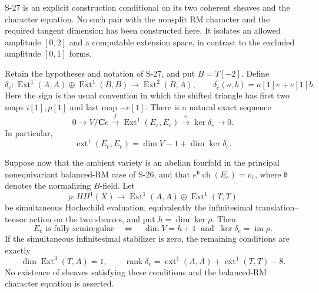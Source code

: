 S-27 is an explicit construction conditional on its two
coherent sheaves and the character equation. No such pair
with the nonsplit RM character and the required tangent
dimension has been constructed here. It isolates an
allowed amplitude $[0,2]$ and a computable extension space,
in contrast to the excluded amplitude $[0,1]$ forms.

\begin{proposition}
\label{prop:semireg-cone-exact-tangent}
Retain the hypotheses and notation of S-27, and put
$B=T[-2]$. Define
\[
 \delta_e:\operatorname{Ext}^1(A,A)\oplus
                 \operatorname{Ext}^1(B,B)
        \longrightarrow\operatorname{Ext}^2(B,A),
 \qquad
 \delta_e(a,b)=a[1]e+e[1]b.
 \tag{S28.1}
\]
Here the sign is the usual convention in which the shifted
triangle has first two maps $i[1],p[1]$ and last map
$-e[1]$. There is a natural exact sequence
\[
 0\longrightarrow V/\mathbf C e
   \xrightarrow{j}\operatorname{Ext}^1(E_e,E_e)
   \xrightarrow{r}\ker\delta_e\longrightarrow0.
 \tag{S28.2}
\]
In particular,
\[
 \operatorname{ext}^1(E_e,E_e)
   =\dim V-1+\dim\ker\delta_e.
 \tag{S28.3}
\]

Suppose now that the ambient variety is an abelian fourfold
in the principal nonequivariant balanced-RM case of S-26,
and that $e^{\mathfrak b}\operatorname{ch}(E_e)=v_1$,
where $\mathfrak b$ denotes the normalizing $B$-field.
Let
\[
 \rho:HH^1(X)\longrightarrow
       \operatorname{Ext}^1(A,A)\oplus
       \operatorname{Ext}^1(T,T)
 \tag{S28.4}
\]
be simultaneous Hochschild evaluation, equivalently the
infinitesimal translation--tensor action on the two sheaves,
and put $h=\dim\ker\rho$. Then
\[
 E_e\text{ is fully semiregular}
 \quad\Longleftrightarrow\quad
 \dim V=h+1\ \text{ and }\ \ker\delta_e=\operatorname{im}\rho.
 \tag{S28.5}
\]
If the simultaneous infinitesimal stabilizer is zero,
the remaining conditions are exactly
\[
 \dim\operatorname{Ext}^3(T,A)=1,
 \qquad
 \operatorname{rank}\delta_e=
       \operatorname{ext}^1(A,A)+\operatorname{ext}^1(T,T)-8.
 \tag{S28.6}
\]
No existence of sheaves satisfying these conditions and
the balanced-RM character equation is asserted.
\end{proposition}
